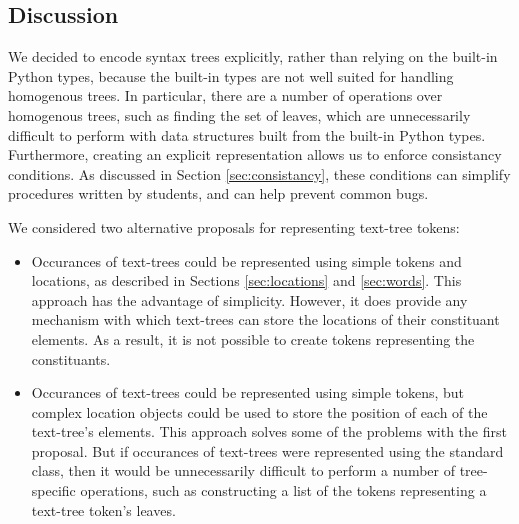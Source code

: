 \documentclass[11pt]{article}
\begin{document}
\subsection{Discussion}

  We decided to encode syntax trees explicitly, rather than relying on
  the built-in Python types, because the built-in types are not well
  suited for handling homogenous trees.  In particular, there are a
  number of operations over homogenous trees, such as finding the set
  of leaves, which are unnecessarily difficult to perform with data
  structures built from the built-in Python types.  Furthermore,
  creating an explicit representation allows us to enforce consistancy
  conditions.  As discussed in Section \ref{sec:consistancy}, these
  conditions can simplify procedures written by students, and can help
  prevent common bugs.

  \vspace{4mm}\noindent We considered two alternative proposals for
  representing text-tree tokens:

  \begin{itemize}

    \item Occurances of text-trees could be represented using simple
    tokens and locations, as described in Sections \ref{sec:locations}
    and \ref{sec:words}.  This approach has the advantage of
    simplicity.  However, it does provide any mechanism with which
    text-trees can store the locations of their constituant elements.
    As a result, it is not possible to create tokens representing the
    constituants.

    \item Occurances of text-trees could be represented using simple
    tokens, but complex location objects could be used to store the
    position of each of the text-tree's elements.  This approach
    solves some of the problems with the first proposal.  But if
    occurances of text-trees were represented using the standard
     class, then it would be unnecessarily difficult to
    perform a number of tree-specific operations, such as constructing
    a list of the tokens representing a text-tree token's leaves.  

  \end{itemize}
\end{document}
